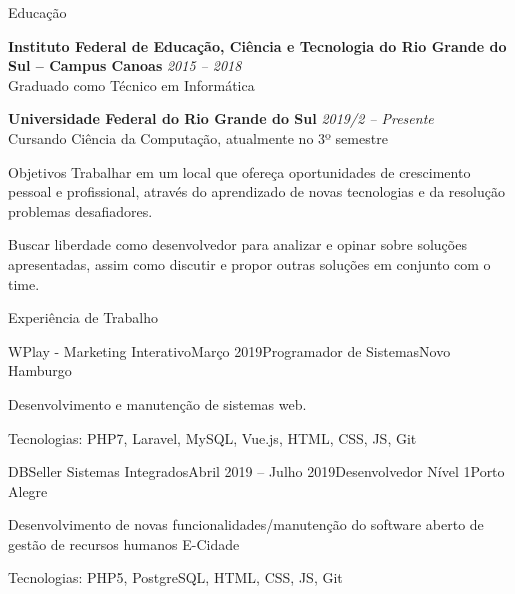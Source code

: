 \documentclass[hidelinks]{resume} %
\begin{document}
\begin{rSection}{Educação}

{\bf Instituto Federal de Educação, Ciência e Tecnologia do Rio Grande do Sul -- Campus Canoas} \hfill {\em 2015 -- 2018}
\\ Graduado como Técnico em Informática

{\bf Universidade Federal do Rio Grande do Sul} \hfill {\em 2019/2 -- Presente}
\\ Cursando Ciência da Computação, atualmente no 3º semestre

\end{rSection}

\begin{rSection}{Objetivos}
Trabalhar em um local que ofereça oportunidades de crescimento pessoal e profissional, através do aprendizado de novas tecnologias e da resolução problemas desafiadores.

Buscar liberdade como desenvolvedor para analizar e opinar sobre soluções apresentadas, assim como
discutir e propor outras soluções em conjunto com o time.
\end{rSection}

\begin{rSection}{Experiência de Trabalho}

\begin{rSubsection}{WPlay - Marketing Interativo}{Março 2019}{Programador de Sistemas}{Novo Hamburgo}
\item Desenvolvimento e manutenção de sistemas web.
\item Tecnologias: PHP7, Laravel, MySQL, Vue.js, HTML, CSS, JS, Git
\end{rSubsection}

\begin{rSubsection}{DBSeller Sistemas Integrados}{Abril 2019 -- Julho 2019}{Desenvolvedor Nível 1}{Porto Alegre}
\item Desenvolvimento de novas funcionalidades/manutenção do software aberto de gestão de recursos humanos E-Cidade
\item Tecnologias: PHP5, PostgreSQL, HTML, CSS, JS, Git
\end{rSubsection}

\end{rSection}
\end{document}
